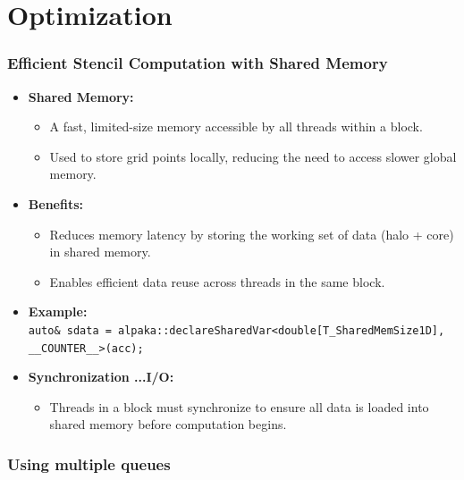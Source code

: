 \documentclass[9pt]{beamer}
\begin{document}
\section{Optimization}
% 
\begin{frame}
\frametitle{Efficient Stencil Computation with Shared Memory}
\begin{itemize}
    \item \textbf{Shared Memory:}
    \begin{itemize}
        \item A fast, limited-size memory accessible by all threads within a block.
        \item Used to store grid points locally, reducing the need to access slower global memory.
    \end{itemize}
    \item \textbf{Benefits:}
    \begin{itemize}
        \item Reduces memory latency by storing the working set of data (halo + core) in shared memory.
        \item Enables efficient data reuse across threads in the same block.
    \end{itemize}
    \item \textbf{Example:} \\
    \texttt{auto\& sdata = alpaka::declareSharedVar<double[T\_SharedMemSize1D], \_\_COUNTER\_\_>(acc);}
    \item \textbf{Synchronization ...I/O:} 
    \begin{itemize}
        \item Threads in a block must synchronize to ensure all data is loaded into shared memory before computation begins.
    \end{itemize}
\end{itemize}
\end{frame}

\begin{frame}
\frametitle{Using multiple queues}

\end{frame}
\end{document}
